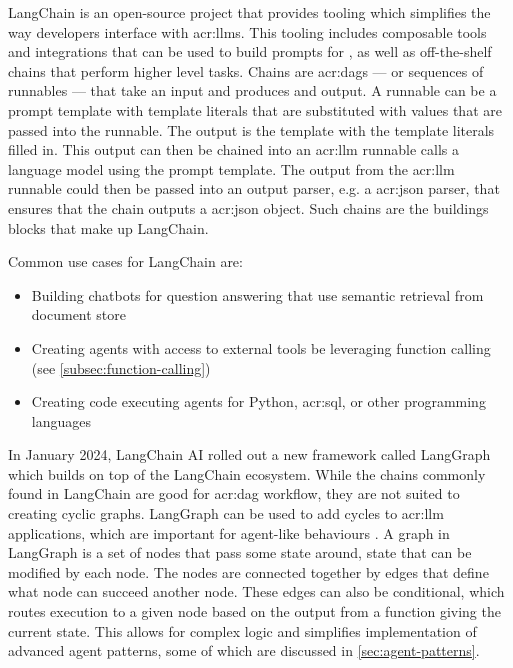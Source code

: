 LangChain \citep{langchainaiLangchainaiLangchain2022} is an open-source project that provides tooling which simplifies the way developers interface with \glspl{acr:llm}. This tooling includes composable tools and integrations that can be used to build prompts for , as well as off-the-shelf chains that perform higher level tasks. Chains are \glspl{acr:dag} --- or sequences of runnables --- that take an input and produces and output. A runnable can be a prompt template with template literals that are substituted with values that are passed into the runnable. The output is the template with the template literals filled in. This output can then be chained into an \acrshort{acr:llm} runnable calls a language model using the prompt template. The output from the \acrshort{acr:llm} runnable could then be passed into an output parser, e.g. a \acrshort{acr:json} parser, that ensures that the chain outputs a \acrshort{acr:json} object. Such chains are the buildings blocks that make up LangChain.

Common use cases for LangChain are:

\begin{itemize}
    \item Building chatbots for question answering that use semantic retrieval from document store
    \item Creating agents with access to external tools be leveraging function calling (see \autoref{subsec:function-calling})
    \item Creating code executing agents for Python, \acrshort{acr:sql}, or other programming languages
\end{itemize}

In January 2024, LangChain AI rolled out a new framework called LangGraph which builds on top of the LangChain ecosystem. While the chains commonly found in LangChain are good for \gls{acr:dag} workflow, they are not suited to creating cyclic graphs. LangGraph can be used to add cycles to \acrshort{acr:llm} applications, which are important for agent-like behaviours \citep{langchainaiLangchainaiLanggraph2024}. A graph in LangGraph is a set of nodes that pass some state around, state that can be modified by each node. The nodes are connected together by edges that define what node can succeed another node. These edges can also be conditional, which routes execution to a given node based on the output from a function giving the current state. This allows for complex logic and simplifies implementation of advanced agent patterns, some of which are discussed in \autoref{sec:agent-patterns}.


